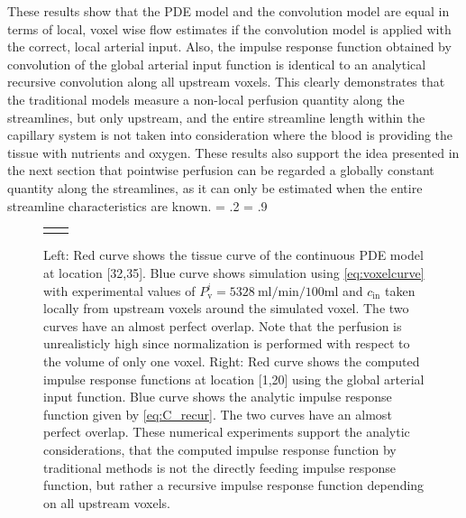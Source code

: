 \documentclass[journal,twocolumn]{IEEEtran}
\newcommand{\Perfv}{P_{\mathrm{v}}}
\newcommand{\siPml}{\milli\litre\per\minute\per100\milli\litre}
\newlength{\fwd}
\newlength{\fht}
\begin{document}
These results show that the PDE model and the convolution model are equal in terms of local, voxel wise flow estimates if the convolution model is applied with the correct, local arterial input. 
Also, the impulse response function obtained by convolution of the global arterial input function is identical to an analytical recursive convolution along all upstream voxels. 
This clearly demonstrates that the traditional models measure a non-local perfusion quantity along the streamlines, but only upstream, and the entire streamline length within the capillary system is not taken into consideration where the blood is providing the tissue with nutrients and oxygen. These results also support the idea presented in the next section that pointwise perfusion can be regarded a globally constant quantity along the streamlines, as it can only be estimated when the entire streamline characteristics are known.
	\fwd = .2\textwidth
	\fht = .9\fwd
	\begin{figure}
		{
		\tiny
		\begin{tabular}{p{\fwd} p{\fwd}}
			 & \\
		\end{tabular}
		}
		\caption{Left: Red curve shows the tissue curve of the continuous PDE model at location [32,35]. Blue curve shows simulation using \eqref{eq:voxelcurve} with experimental values of $\Perfv^i=\SI{5328}{\siPml}$ and $c_{\mathrm{in}}$ taken locally from upstream voxels around the simulated voxel. The two curves have an almost perfect overlap. Note that the perfusion is unrealisticly high since normalization is performed with respect to the volume of only one voxel. Right: Red curve shows the computed impulse response functions at location [1,20] using the global arterial input function. Blue curve shows the analytic impulse response function given by \eqref{eq:C_recur}. The two curves have an almost perfect overlap. These numerical experiments support the analytic considerations, that the computed impulse response function by traditional methods is not the directly feeding impulse response function, but rather a recursive impulse response function depending on all upstream voxels. }\label{fig:VoxelComp}
	\end{figure}
	

\end{document}
